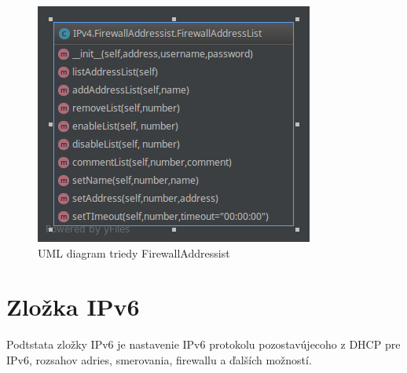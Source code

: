 \begin{figure}[H]
\centering
\includegraphics[scale=0.6]{../text/addList.png}
\caption{UML diagram triedy FirewallAddressist}
\label{fig:addList}
\end{figure}
\section{Zložka IPv6}
Podtstata zložky IPv6 je nastavenie IPv6 protokolu pozostavújecoho z DHCP pre IPv6, rozsahov adries, smerovania, firewallu a ďalších možností.
